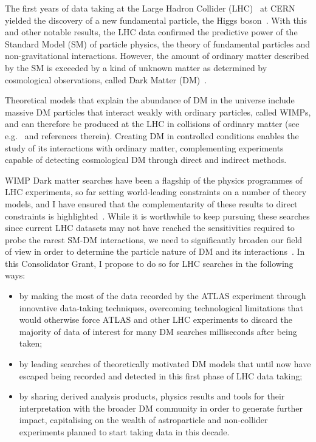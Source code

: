 \documentclass[11pt,a4paper]{article}
\begin{document}
The first years of data taking at the Large Hadron Collider (LHC)~\cite{LHC2008} at CERN yielded the discovery of a new fundamental particle, the Higgs boson~\cite{Khachatryan:2016vau}. With this and other notable results, the LHC data confirmed the predictive power of the Standard Model (SM) of particle physics, the theory of fundamental particles and non-gravitational interactions. However, the amount of ordinary matter described by the SM is exceeded by a kind of unknown matter as determined by cosmological observations, called Dark Matter (DM)~\cite{Bertone:2016nfn}. 


Theoretical models that explain the abundance of DM in the universe include massive DM particles that interact weakly with ordinary particles, called WIMPs, and can therefore be produced at the LHC in collisions of ordinary matter (see e.g.~\cite{Boveia:2018yeb} and references therein). 
Creating DM in controlled conditions enables the study of its interactions with ordinary matter, complementing experiments capable of detecting cosmological DM  through direct and indirect methods. %

WIMP Dark matter searches have been a flagship of the physics programmes of LHC experiments, so far setting world-leading constraints on a number of theory models, and I have ensured that the complementarity of these results to direct constraints is highlighted~\cite{DMWG}. While it is worthwhile to keep pursuing these searches since current LHC datasets may not have reached the sensitivities required to probe the rarest SM-DM interactions, we need to significantly broaden our field of view in order to determine the particle nature of DM and its interactions~\cite{Bertone:2018xtm}. In this Consolidator Grant, I propose to do so for LHC searches in the following ways:

\begin{itemize}
	\item by making the most of the data recorded by the ATLAS experiment through innovative data-taking techniques, overcoming technological limitations that would otherwise force ATLAS and other LHC experiments to discard the majority of data of interest for many DM searches milliseconds after being taken;
	\item by leading searches of theoretically motivated DM models that until now have escaped being recorded and detected in this first phase of LHC data taking;
	\item by sharing derived analysis products, physics results and tools for their interpretation with the broader DM community in order to generate further impact, capitalising on the wealth of astroparticle and non-collider experiments planned to start taking data in this decade. 
\end{itemize}
\end{document}
